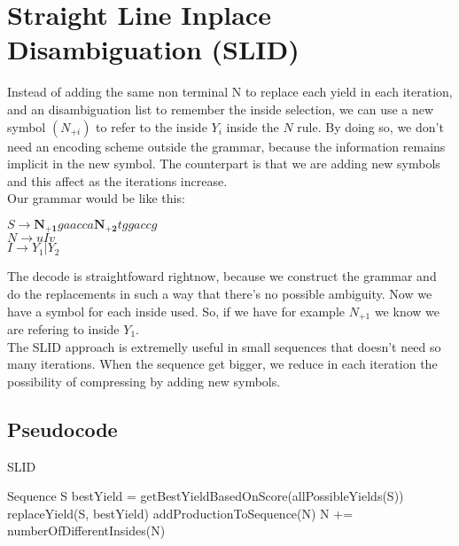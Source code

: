 	\newpage

	\section{Straight Line Inplace Disambiguation (SLID)}

	Instead of adding the same non terminal N to replace each yield in each iteration,
	 and an disambiguation list to remember
	the inside selection, we can use a new symbol $(N_{+i})$ to refer
	to the inside $Y_i$ inside the $N$ rule. By doing so, we don't need an encoding
	scheme outside the grammar, because the information remains implicit in the new symbol. 
	The counterpart	is that we are adding new symbols and this affect as the iterations
	increase. \\

	Our grammar would be like this: \\
	\begin{center}
	$S \rightarrow \bm{N_{+1}}gaacca\bm{N_{+2}}tggaccg$\\
	$N \rightarrow u I v$ \\
	$I \rightarrow Y_1 | Y_2$
	\end{center}

	The decode is straightfoward rightnow, because we construct the grammar and
	do the replacements in such a way that there's no possible ambiguity. Now we have
	a symbol for each inside used. So, if we have for example $N_{+1}$ we know we are 
	refering to inside $Y_1$.\\

	The SLID approach is extremelly useful in small sequences that doesn't need so many
	iterations. When the sequence get bigger, we reduce in each iteration the possibility
	of compressing by adding new symbols. \\


	\subsection{Pseudocode}

	\begin{algorithm}
	\caption{SLID}
	\begin{algorithmic}[1]
	\REQUIRE Sequence S
	\STATE bestYield = getBestYieldBasedOnScore(allPossibleYields(S))
	\STATE replaceYield(S, bestYield)
	\STATE addProductionToSequence(N)
	\STATE N += numberOfDifferentInsides(N)
	\ENDWHILE

	\end{algorithmic}
	\end{algorithm}


